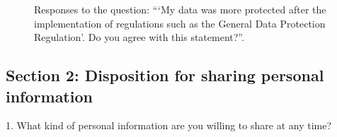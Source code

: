 \begin{figure}[H]
    \begin{center}
        \caption{Responses to the question: ```My data was more protected after the implementation of regulations such as the General Data Protection Regulation'. Do you agree with this statement?''.}
        \label{fig:survey_s1_q30}
    \end{center}
\end{figure}

\subsection*{Section 2: Disposition for sharing personal information}

1. What kind of personal information are you willing to share at any time?

